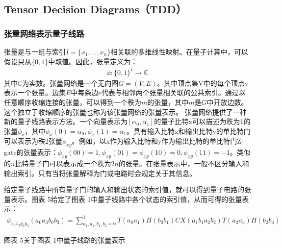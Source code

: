 \subsection{Tensor Decision Diagrams（TDD）}
\subsubsection{张量网络表示量子线路}
张量是与一组与索引\(I=\{x_1,\ldots,x_n\}\)相关联的多维线性映射。在量子计算中，可以假设只从\(\{0,1\}\)中取值。因此，张量定义为：
\begin{align}
    \phi :{\{0,1\}}^I\rightarrow\mathbb{C}
\end{align}
其中\(\mathbb{C}\)为实数。张量网络是一个无向图\(G=\left(V,E\right)\)。其中顶点集V中的每个顶点v表示一个张量。边集\(E\)中每条边\(e\)代表与相邻两个张量相关联的公共索引。通过以任意顺序收缩连接的张量，可以得到一个秩为\(m\)的张量，其中\(m\)是$G$中开放边数。这个独立于收缩顺序的张量也称为该张量网络的张量表示\citep{biamonte2019lectures}。
张量网络提供了一种新的量子线路表示方法\citep{pednault2017breaking}。一个向量表示为$[\alpha_0,\alpha_1]$的量子比特x可以描述为秩为1的张量$\phi_x$，其中$\phi_x\left(0\right)=\alpha_0, \phi_x\left(1\right)=\alpha_1$。具有输入比特x和输出比特y的单比特门可以表示为秩2张量$\phi_{xy}$。例如，以x作为输入比特和y作为输出比特的单比特门Z-gate的张量表示：$\phi_{xy}\left(00\right)=1,\phi_{xy}\left(01\right)=\phi_{xy}\left(10\right)=0,\phi_{xy}\left(11\right)=-1$。类似的$n$比特量子门可以表示成一个秩为$2n$的张量。在张量表示中，一般不区分输入和输出索引。只有当将张量解释为门或电路时会规定关于其信息。

给定量子线路中所有量子门的输入和输出状态的索引值，就可以得到量子电路的张量表示。图表 5给定了图表 1中量子线路中各个状态的索引值，从而可得的张量表示：
\begin{align}
    \phi_{x_0x_3y_0y_3}\left(a_0a_3b_0b_3\right)=\sum_{a_1,a_2,b_1,b_2=0}^{1}T\left(a_0a_1\right)H\left(b_0b_1\right)CX\left(a_1b_1a_2b_2\right)T\left(a_2a_3\right)H\left(b_2b_3\right)
\end{align}
 
图表 5关于图表 1中量子线路的张量表示

